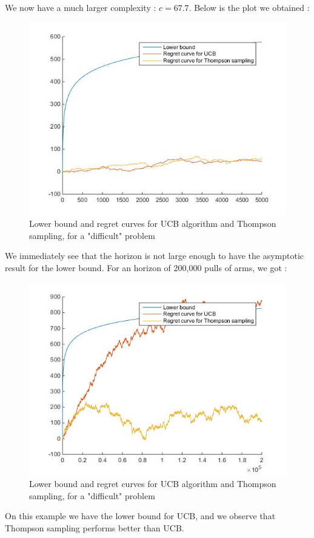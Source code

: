 \documentclass[11pt,a4paper]{article}
\begin{document}
We now have a much larger complexity : $c = 67.7$.
Below is the plot we obtained :
\begin{figure}[H]
	\centering
	\noindent\includegraphics[scale=0.4]{regret_thom_diff.jpg}
	\caption{Lower bound and regret curves for UCB algorithm and Thompson sampling, for a "difficult" problem}
\end{figure}

We immediately see that the horizon is not large enough to have the asymptotic result for the lower bound. For an horizon of 200,000 pulls of arms, we got :


\begin{figure}[H]
	\centering
	\noindent\includegraphics[scale=0.4]{regret_thom_diff2.jpg}
	\caption{Lower bound and regret curves for UCB algorithm and Thompson sampling, for a "difficult" problem}
\end{figure}

On this example we have the lower bound for UCB, and we observe that Thompson sampling performs better than UCB.
\end{document}
